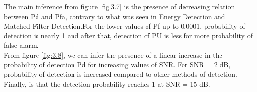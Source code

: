 \documentclass[a4paper]{article}
\begin{document}
The main inference from figure \ref{fig:3.7} is the presence of decreasing relation between Pd and Pfa, contrary to what was seen in Energy Detection and Matched Filter Detection.For the lower values of Pf up to 0.0001, probability of detection is nearly 1 and after that, detection of PU is less for more probability of false alarm.\\[8pt]

From figure \ref{fig:3.8}, we can infer the presence of a linear increase in the probability of detection Pd for increasing values of SNR. For SNR = 2 dB, probability of detection is increased compared to other methods of detection. Finally, is that the detection probability reaches 1 at SNR = 15 dB.\\
\newpage
\end{document}
